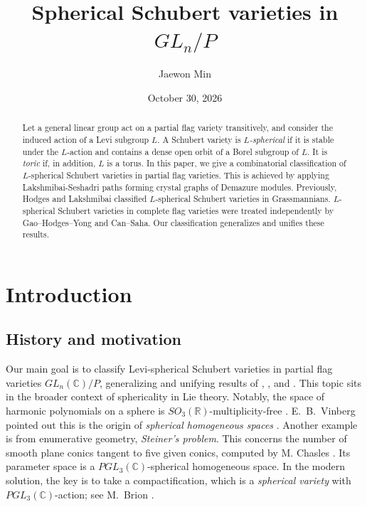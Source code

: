 \documentclass[12pt]{amsart}
\title{Spherical Schubert varieties in $GL_n / P$}
\author{Jaewon Min}
\date{October 30, 2026}
\theoremstyle{definition}
\theoremstyle{remark}
\newcommand{\R}{\mathbb{R}}
\newcommand{\C}{\mathbb{C}}
\begin{document}
\maketitle

\vspace{-1ex}

\begin{abstract}
Let a general linear group act on a partial flag variety transitively, and consider the induced action of a Levi subgroup $L$. A Schubert variety is \emph{$L$-spherical} if it is stable under the $L$-action and contains a dense open orbit of a Borel subgroup of $L$. It is \emph{toric} if, in addition, $L$ is a torus. In this paper, we give a combinatorial classification of $L$-spherical Schubert varieties in partial flag varieties. This is achieved by applying Lakshmibai-Seshadri paths forming crystal graphs of Demazure modules. Previously, Hodges and Lakshmibai classified $L$-spherical Schubert varieties in Grassmannians. $L$-spherical Schubert varieties in complete flag varieties were treated independently by Gao--Hodges--Yong and Can--Saha. Our classification generalizes and unifies these results.
\end{abstract}

\setcounter{tocdepth}{2}




\section{Introduction}\label{sub1.1}

\subsection{History and motivation}

Our main goal is to classify Levi-spherical Schubert varieties in partial flag varieties $GL_n (\C) /P$, generalizing and unifying results of \cite{MR3044412}, \cite{MR4517644}, \cite{MR4690502} and \cite{MR4643501}. This topic sits in the broader context of sphericality in Lie theory. Notably, the space of harmonic polynomials on a sphere is $SO_3 (\R)$-multiplicity-free \cite[Corollary 17.17]{MR3112817}. E.~B.~Vinberg pointed out this is the origin of \textit{spherical homogeneous spaces} \cite[Ch.~I, \S 3]{MR1845642}. Another example is from enumerative geometry, \textit{Steiner's problem}. This concerns the number of smooth plane conics tangent to five given conics, computed by M. Chasles \cite[Ch.~0]{MR3617981}. Its parameter space is a $PGL_3(\C)$-spherical homogeneous space. In the modern solution, the key is to take a compactification, which is a \textit{spherical variety} with $PGL_3(\C)$-action; see M.~Brion \cite[\S 2.4, \S3.6]{MR1040855}.
\end{document}
